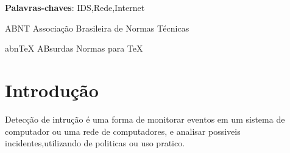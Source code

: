 \documentclass[
	12pt,				%
	openright,			%
	oneside,
	a4paper,			%
	english,			%
	french,				%
	spanish,			%
	brazil				%
	]{abntex2}
\begin{document}
\frenchspacing 


\imprimircapa

\imprimirfolhaderosto%


\setlength{\absparsep}{18pt} %
\begin{resumo}
   
 \textbf{Palavras-chaves}: IDS,Rede,Internet
\end{resumo}

\listoffigures*
\cleardoublepage

\listoftables*
\cleardoublepage

\begin{siglas}
  \item[ABNT] Associação Brasileira de Normas Técnicas
  \item[abnTeX] ABsurdas Normas para TeX
\end{siglas}

\tableofcontents*
\cleardoublepage

\textual

\chapter[Introdução]{Introdução}
Detecção de intrução é uma forma de monitorar eventos em um sistema de computador ou uma rede de computadores,
e analisar possiveis incidentes,utilizando de politicas ou uso pratico.
\end{document}
